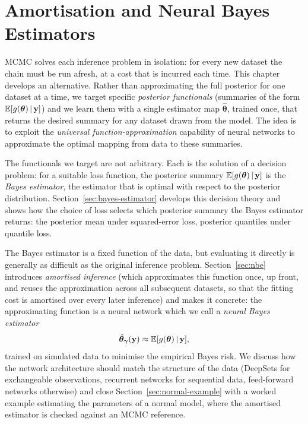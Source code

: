 \chapter{Amortisation and Neural Bayes Estimators}
\label{ch:amortization}

MCMC solves each inference problem in isolation:
for every new dataset the chain must be run afresh, at a cost that is
incurred each time. This chapter
develops an alternative. Rather than approximating the full posterior
for one dataset at a time, we target specific \emph{posterior
functionals} (summaries of the form $\mathbb{E}[g(\bm{\theta}) \,|\, \mathbf{y}]$) and we learn them with a single
estimator map $\hat{\bm{\theta}}$, trained once, that returns the desired summary for any
dataset drawn from the model. The idea is to exploit the \emph{universal
function-approximation} capability of neural networks to approximate
the optimal mapping from data to these summaries.

The functionals we target are not arbitrary. Each is the solution of a
decision problem: for a suitable loss function, the posterior summary
$\mathbb{E}[g(\bm{\theta}) \,|\, \mathbf{y}]$ is the \emph{Bayes estimator},
the estimator that is optimal with respect to the posterior
distribution. Section~\ref{sec:bayes-estimator} develops this decision
theory and shows how the choice of loss selects which posterior
summary the Bayes estimator returns: the posterior mean under
squared-error loss, posterior quantiles under quantile loss.

The Bayes estimator is a fixed function of the data, but evaluating it
directly is generally as difficult as the original inference problem.
Section~\ref{sec:nbe} introduces \emph{amortised inference} (which
approximates this function once, up front, and reuses the
approximation across all subsequent datasets, so that the fitting cost
is amortised over every later inference) and makes it concrete: the
approximating function is a neural network which we call a \emph{neural
Bayes estimator}
%
\begin{equation}
  \hat{\bm{\theta}}_{\bm{\gamma}}(\mathbf{y})
\approx \mathbb{E}[g(\bm{\theta}) \,|\, \mathbf{y}],
\end{equation}
%
trained on simulated data to minimise the empirical Bayes risk. We discuss how the network architecture should match
the structure of the data (DeepSets for exchangeable observations,
recurrent networks for sequential data, feed-forward networks
otherwise) and close Section~\ref{sec:normal-example} with a
worked example estimating the parameters of a normal model, where the
amortised estimator is checked against an MCMC reference.


